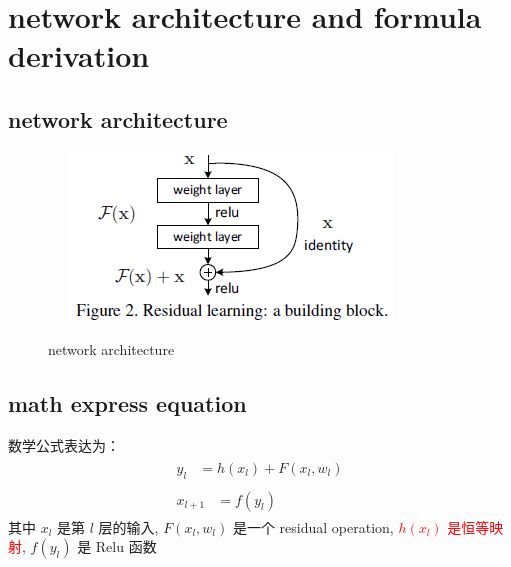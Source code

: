 \documentclass[12pt]{ctexart}%
\begin{document}
	\section{\quad network architecture and formula derivation}
			\subsection{\quad network architecture}
						\begin{figure}[H]
							\vspace{-0.2cm}  %
							\setlength{\abovecaptionskip}{-0.2cm}   %
							\centering
							\includegraphics[scale=1]{network_architecture.png}
							\renewcommand{\figurename}{Fig} %
							\caption{network architecture}
							\label{fig2:network architecture}
						\end{figure}
					
			\subsection{math express equation}
					
						数学公式表达为：
							\begin{align}
								\begin{split}
									y_l &= h(x_l) + F(x_l, w_l) \label{identity mapping}
								\end{split}
								\\
								\begin{split}
									x_{l+1} &= f(y_l) \label{next layer reslut}
								\end{split}
							\end{align}
						其中 $x_l$ 是第 $l$ 层的输入, $F(x_l, w_l)$ 是一个 residual operation, \textcolor{red}{$h(x_l)$ 是恒等映射}, $f(y_l)$ 是 Relu 函数
						
\end{document}
